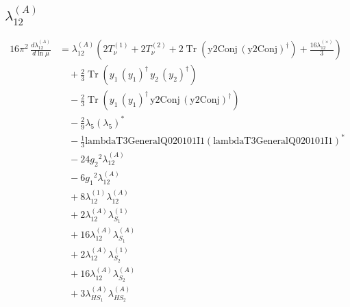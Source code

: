 \documentclass[10pt,a4paper]{article}
\begin{document}
\subsection*{$\lambda_{12}^{(A)}$}
\begin{align*}
16\pi^2\,\frac{d \lambda_{12}^{(A)}}{d\ln\mu} &={\lambda_{12}^{(A)}} \left(2 T_{\nu}^{(1)}+2 T_{\nu}^{(2)}+2 \operatorname{Tr}\!\left(\text{y2Conj}\,\left(\text{y2Conj}\right)^{\dagger}\right)+\frac{16 {\lambda_{12}^{(\times)}}}{3}\right) \\
&\quad +\frac{2}{3} \operatorname{Tr}\!\left({y_1}\,\left({y_1}\right)^{\dagger}\,{y_2}\,\left({y_2}\right)^{\dagger}\right) \\
&\quad -\frac{2}{3} \operatorname{Tr}\!\left({y_1}\,\left({y_1}\right)^{\dagger}\,\text{y2Conj}\,\left(\text{y2Conj}\right)^{\dagger}\right) \\
&\quad -\frac{2}{9} {\lambda_5} \left({\lambda_5}\right)^{*} \\
&\quad -\frac{1}{3} \text{lambdaT3GeneralQ020101I1} \left(\text{lambdaT3GeneralQ020101I1}\right)^{*} \\
&\quad -24 {g_2}^2 {\lambda_{12}^{(A)}} \\
&\quad -6 {g_1}^2 {\lambda_{12}^{(A)}} \\
&\quad +8 {\lambda_{12}^{(1)}} {\lambda_{12}^{(A)}} \\
&\quad +2 {\lambda_{12}^{(A)}} {\lambda_{S_1}^{(1)}} \\
&\quad +16 {\lambda_{12}^{(A)}} {\lambda_{S_1}^{(A)}} \\
&\quad +2 {\lambda_{12}^{(A)}} {\lambda_{S_2}^{(1)}} \\
&\quad +16 {\lambda_{12}^{(A)}} {\lambda_{S_2}^{(A)}} \\
&\quad +3 {\lambda_{HS_1}^{(A)}} {\lambda_{HS_2}^{(A)}} \\
\end{align*}
\end{document}
